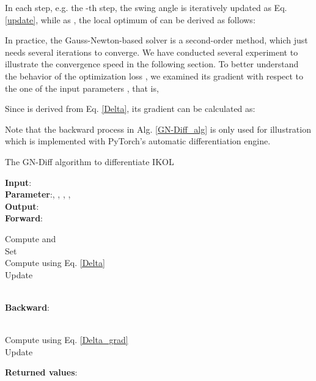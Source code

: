 \documentclass[letterpaper]{article} \usepackage{aaai23}  \usepackage{times}  \usepackage{helvet}  \usepackage{courier}  \usepackage[hyphens]{url}  \usepackage{graphicx} \urlstyle{rm} \def\UrlFont{\rm}  \usepackage{natbib}  \usepackage{caption} \frenchspacing  \setlength{\pdfpagewidth}{8.5in}  \setlength{\pdfpageheight}{11in}  \usepackage{algorithm}
\begin{document}
In each step, e.g. the -th step, the swing angle is iteratively updated as Eq. \ref{update}, while as , the local optimum of  can be derived as follows:


 
In practice, the Gauss-Newton-based solver is a second-order method, which just needs several iterations to converge. We have conducted several experiment to illustrate the convergence speed in the following section. To better understand the behavior of the optimization loss , we examined its gradient with respect to the one of the input parameters , that is, 




 
Since  is derived from Eq. \ref{Delta}, its gradient can be calculated as:

 





Note that the backward process in Alg. \ref{GN-Diff_alg} is only used for illustration which is implemented with PyTorch's automatic differentiation engine.



\begin{algorithm}[tb]
\begin{spacing}{1.1} 
\caption{The GN-Diff algorithm to differentiate IKOL}
\label{GN-Diff_alg}
\textbf{Input}: \\
\textbf{Parameter}:, , , , \\
\textbf{Output}:  \\
\textbf{Forward}:
\begin{algorithmic}[1] 
	\STATE  Compute  and  \\
	\STATE  Set  \\
	\STATE  Compute  using Eq. \ref{Delta} \\
	\STATE  Update \\
\ENDFOR \\
\end{algorithmic}
\textbf{Backward}:
\begin{algorithmic}[1] \STATE  \\
   \STATE  Compute  using Eq. \ref{Delta_grad} \\
   \STATE  Update \\
\ENDFOR
\end{algorithmic}
\textbf{Returned values}: 	
\end{spacing}
\end{algorithm}
\end{document}
